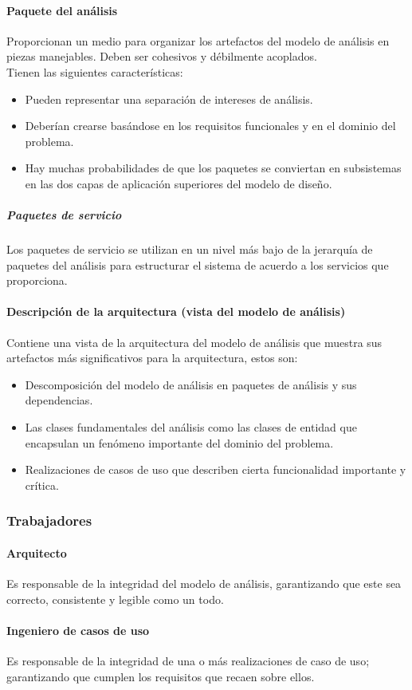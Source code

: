 \paragraph{Paquete del análisis}
Proporcionan un medio para organizar los artefactos del modelo de análisis en piezas manejables. Deben ser cohesivos y débilmente acoplados.\\
Tienen las siguientes características:
\begin{itemize}
\item Pueden representar una separación de intereses de análisis.
\item Deberían crearse basándose en los requisitos funcionales y en el dominio del problema.
\item Hay muchas probabilidades de que  los paquetes se conviertan en subsistemas en las dos capas de aplicación superiores del modelo de diseño.
\end{itemize}
\subparagraph{Paquetes de servicio}
Los paquetes de servicio se utilizan en un nivel más bajo de la jerarquía de paquetes del análisis para estructurar el sistema de acuerdo a los servicios que proporciona.
\paragraph{Descripción de la arquitectura (vista del modelo de análisis)}
Contiene una vista de la arquitectura del modelo de análisis que muestra sus artefactos más significativos para la arquitectura, estos son:
\begin{itemize}
\item Descomposición del modelo de análisis en paquetes de análisis y sus dependencias.
\item Las clases fundamentales del análisis como las clases de entidad que encapsulan un fenómeno importante del dominio del problema.
\item Realizaciones de casos de uso que describen cierta funcionalidad importante y crítica.
\end{itemize} 
\subsubsection{Trabajadores}
\paragraph{Arquitecto}
Es responsable de la integridad del modelo de análisis, garantizando que este sea correcto, consistente y legible como un todo.
\paragraph{Ingeniero de casos de uso}
Es responsable de la integridad de una o más realizaciones de caso de uso; garantizando que cumplen los requisitos que recaen sobre ellos.
